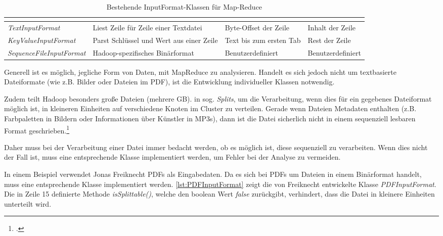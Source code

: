 \begin{table}[h]
	\centering
	\begin{tabularx}{\textwidth}{| l | X | X | X |}
		\hline
		\rowcolor[HTML]{3531FF} 
		\multicolumn{1}{|l|}{\cellcolor[HTML]{4F88BB}{\color[HTML]{FFFFFF} {\bf Klasse}}} & \multicolumn{1}{l|}{\cellcolor[HTML]{4F88BB}{\color[HTML]{FFFFFF} {\bf Beschreibung}}} & \multicolumn{1}{l|}{\cellcolor[HTML]{4F88BB}{\color[HTML]{FFFFFF} {\bf Key}}} & \multicolumn{1}{l|}{\cellcolor[HTML]{4F88BB}{\color[HTML]{FFFFFF} {\bf Value}}} \\ \hline
		\textit{TextInputFormat} & Liest Zeile für Zeile einer Textdatei & Byte-Offset der Zeile & Inhalt der Zeile \\  \hline
		\textit{KeyValueInputFormat} & Parst Schlüssel und Wert aus einer Zeile & Text bis zum ersten Tab & Rest der Zeile \\ \hline
		\textit{SequenceFileInputFormat} & Hadoop-spezifisches Binärformat & Benutzerdefiniert & Benutzerdefiniert \\  \hline
	\end{tabularx}
	\caption{Bestehende InputFormat-Klassen für Map-Reduce\footnotemark}
	\label{tbl:InputFormatKlasses}
\end{table}

Generell ist es möglich, jegliche Form von Daten, mit MapReduce zu analysieren. Handelt es sich jedoch nicht um textbasierte Dateiformate (wie z.B. Bilder oder Dateien im \ac{PDF}), ist die Entwicklung individueller Klassen notwendig.

Zudem teilt Hadoop besonders große Dateien (mehrere \ac{GB}). in sog. \textit{Splits}, um die Verarbeitung, wenn dies für ein gegebenes Dateiformat möglich ist, in kleineren Einheiten auf verschiedene Knoten im Cluster zu verteilen. \flqq Gerade wenn Dateien Metadaten enthalten (z.B. Farbpaletten in Bildern oder Informationen über Künstler in MP3s), dann ist die Datei sicherlich nicht in einem sequenziell lesbaren Format geschrieben.\frqq\footcite[S. 110]{Freiknecht.2014}

Daher muss bei der Verarbeitung einer Datei immer bedacht werden, ob es möglich ist, diese sequenziell zu verarbeiten. Wenn dies nicht der Fall ist, muss eine entsprechende Klasse implementiert werden, um Fehler bei der Analyse zu vermeiden.

In einem Beispiel verwendet Jonas Freiknecht \acp{PDF} als Eingabedaten. Da es sich bei \acp{PDF} um Dateien in einem Binärformat handelt, muss eine entsprechende Klasse implementiert werden. \autoref{lst:PDFInputFormat} zeigt die von Freiknecht entwickelte Klasse \textit{PDFInputFormat}. Die in Zeile 15 definierte Methode \textit{isSplittable()}, welche den boolean Wert \textit{false} zurückgibt, verhindert, dass die Datei in kleinere Einheiten unterteilt wird. \\

